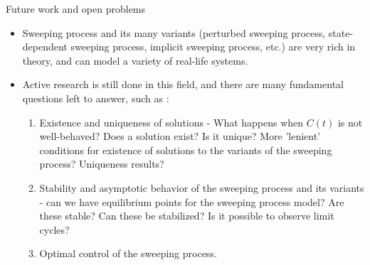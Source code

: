 \documentclass[8pt,aspectratio=169]{beamer}
\begin{document}
\begin{frame}{Future work and open problems}
    \begin{itemize}
        \item Sweeping process and its many variants (perturbed sweeping process, state-dependent sweeping process, implicit sweeping process, etc.) are very rich in theory, and can model a variety of real-life systems.
        \item Active research is still done in this field, and there are many fundamental questions left to answer, such as :
        \begin{enumerate}
            \item Existence and uniqueness of solutions - What happens when $C(t)$ is not well-behaved? Does a solution exist? Is it unique? More 'lenient' conditions for existence of solutions to the variants of the sweeping process? Uniqueness results?
            \item Stability and asymptotic behavior of the sweeping process and its variants - can we have equilibrium points for the sweeping process model? Are these stable? Can these be stabilized? Is it possible to observe limit cycles? 
            \item Optimal control of the sweeping process.
        \end{enumerate}
    \end{itemize}
\end{frame}
\end{document}
